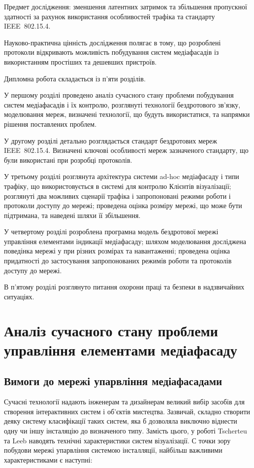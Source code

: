 \documentclass[a4paper,ukrainian,utf8,nocolumnsxix,floatsection,equationsection]{eskdtext}
\newcommand{\iee}[0]{IEEE~802.15.4\xspace}
\begin{document}
Предмет дослідження: зменшення латентних затримок та збільшення пропускної здатності за рахунок використання особливостей трафіка та стандарту \iee.

Науково-практична цінність дослідження полягає в тому, що розроблені протоколи відкривають можливість побудування систем медіафасадів із використанням простіших та дешевших пристроїв.

Дипломна робота складається із п’яти розділів.

У першому розділі проведено аналіз сучасного стану проблеми побудування систем медіафасадів і їх контролю, розглянуті технології бездротового зв’язку, моделювання мереж, визначені технології, що будуть використатися, та напрямки рішення поставлених проблем.

У другому розділі детально розглядається стандарт бездротових мереж \iee. Визначені ключові особливості мереж зазначеного стандарту, що були використані при розробці протоколів.

У третьому розділі розглянута архітектура системи ad-hoc медіафасаду і типи трафіку, що використовується в системі для контролю Клієнтів візуалізації; розглянуті два можливих сценарії трафіка і запропоновані режими роботи і протоколи доступу до мережі; проведена оцінка розміру мережі, що може бути підтримана, та наведені шляхи її збільшення.

У четвертому розділі розроблена програмна модель бездротової мережі управління елементами індикації медіафасаду; шляхом моделювання досліджена поведінка мережі у при різних розмірах та навантаженні; проведена оцінка придатності до застосування запропонованих режимів роботи та протоколів доступу до мережі.

В п’ятому розділі розглянуто питання охорони праці та безпеки в надзвичайних ситуаціях.

\section{Аналіз сучасного стану проблеми управління елементами медіафасаду}
\label{sec:1}

\subsection{Вимоги до мережі упарвління медіафасадами} 

Сучасні технології надають інженерам та дизайнерам великий вибір засобів для створення інтерактивних систем і об’єктів мистецтва. Зазвичай, складно створити деяку систему класифікації таких систем, яка б дозволяла виключно віднести одну чи іншу інсталяцію до визначеного типу. Замість цього, у роботі \cite{media:facades:fundamentals} Tscherteu та Leeb наводять технічні характеристики систем візуалізації. С точки зору побудови мережі упарвління системою інсталляції, найбільш важливими характеристиками є наступні:
\end{document}
